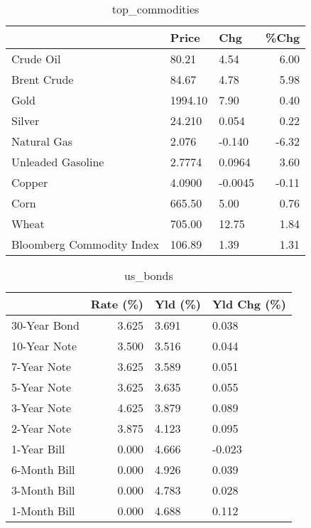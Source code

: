 \documentclass{article}%
\begin{document}
\begin{table}[htbp]%
\caption{top\_commodities}%
\centering%
\begin{adjustbox}{width=1\textwidth}%
\begin{tabular}{lllr}
\toprule
                          &   Price &     Chg &  \%Chg \\
\midrule
               Crude Oil  &   80.21 &    4.54 &  6.00 \\
             Brent Crude  &   84.67 &    4.78 &  5.98 \\
                    Gold  & 1994.10 &    7.90 &  0.40 \\
                  Silver  &  24.210 &   0.054 &  0.22 \\
             Natural Gas  &   2.076 &  -0.140 & -6.32 \\
       Unleaded Gasoline  &  2.7774 &  0.0964 &  3.60 \\
                  Copper  &  4.0900 & -0.0045 & -0.11 \\
                    Corn  &  665.50 &    5.00 &  0.76 \\
                   Wheat  &  705.00 &   12.75 &  1.84 \\
Bloomberg Commodity Index &  106.89 &    1.39 &  1.31 \\
\bottomrule
\end{tabular}
%
\end{adjustbox}%
\end{table}

%


\begin{table}[htbp]%
\caption{us\_bonds}%
\centering%
\begin{adjustbox}{width=1\textwidth}%
\begin{tabular}{lrll}
\toprule
             &  Rate (\%) & Yld (\%) & Yld Chg (\%) \\
\midrule
30-Year Bond &     3.625 &   3.691 &       0.038 \\
10-Year Note &     3.500 &   3.516 &       0.044 \\
 7-Year Note &     3.625 &   3.589 &       0.051 \\
 5-Year Note &     3.625 &   3.635 &       0.055 \\
 3-Year Note &     4.625 &   3.879 &       0.089 \\
 2-Year Note &     3.875 &   4.123 &       0.095 \\
 1-Year Bill &     0.000 &   4.666 &      -0.023 \\
6-Month Bill &     0.000 &   4.926 &       0.039 \\
3-Month Bill &     0.000 &   4.783 &       0.028 \\
1-Month Bill &     0.000 &   4.688 &       0.112 \\
\bottomrule
\end{tabular}
%
\end{adjustbox}%
\end{table}
\end{document}
